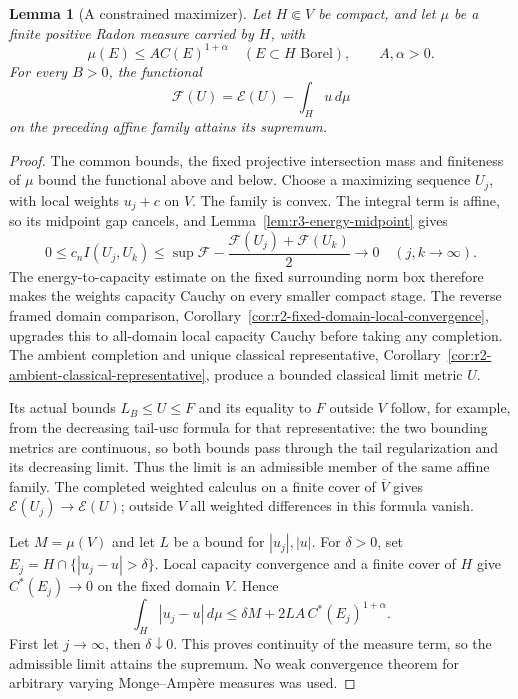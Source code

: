 \documentclass[11pt,a4paper]{article}
\numberwithin{equation}{section}
\newtheorem{lemma}[theorem]{Lemma}
\theoremstyle{definition}
\theoremstyle{remark}
\begin{document}
\begin{lemma}[A constrained maximizer]
\label{lem:r3-capdir-maximizer}
Let $H\Subset V$ be compact, and let $\mu$ be a finite positive
Radon measure carried by $H$, with
\[
 \mu(E)\leq A C(E)^{1+\alpha}\quad
 (E\subset H\text{ Borel}),\qquad A,\alpha>0.
\]
For every $B>0$, the functional
\[
 \mathcal F(U)=\mathcal E(U)-\int_H u\,d\mu
\]
on the preceding affine family attains its supremum.
\end{lemma}

\begin{proof}
The common bounds, the fixed projective intersection mass and
finiteness of $\mu$ bound the functional above and below. Choose
a maximizing sequence $U_j$, with local weights $u_j+c$ on $V$.
The family is convex. The integral term is affine, so its midpoint
gap cancels, and Lemma~\ref{lem:r3-energy-midpoint} gives
\[
 0\leq c_n I(U_j,U_k)
 \leq\sup\mathcal F-
              \frac{\mathcal F(U_j)+\mathcal F(U_k)}2
 \longrightarrow0\quad(j,k\to\infty).
\]
The energy-to-capacity estimate on the fixed surrounding norm box
therefore makes the weights capacity Cauchy on every smaller
compact stage. The reverse framed domain comparison,
Corollary~\ref{cor:r2-fixed-domain-local-convergence}, upgrades
this to all-domain local capacity Cauchy before taking any
completion. The ambient completion and unique classical
representative, Corollary~\ref{cor:r2-ambient-classical-representative},
produce a bounded classical limit metric $U$.

Its actual bounds $L_B\leq U\leq F$ and its equality to $F$
outside $V$ follow, for example, from the decreasing tail-usc
formula for that representative: the two bounding metrics are
continuous, so both bounds pass through the tail regularization
and its decreasing limit. Thus the limit is an admissible member
of the same affine family. The completed weighted calculus on
a finite cover of $\overline V$ gives
$\mathcal E(U_j)\to\mathcal E(U)$; outside $V$ all weighted
differences in this formula vanish.

Let $M=\mu(V)$ and let $L$ be a bound for $|u_j|,|u|$. For
$\delta>0$, set $E_j=H\cap\{|u_j-u|>\delta\}$. Local capacity
convergence and a finite cover of $H$ give $C^*(E_j)\to0$ on
the fixed domain $V$. Hence
\[
 \int_H|u_j-u|\,d\mu
 \leq\delta M+2LA\,C^*(E_j)^{1+\alpha}.
\]
First let $j\to\infty$, then $\delta\downarrow0$. This proves
continuity of the measure term, so the admissible limit attains
the supremum. No weak convergence theorem for arbitrary varying
Monge--Amp\`ere measures was used.
\end{proof}
\end{document}
